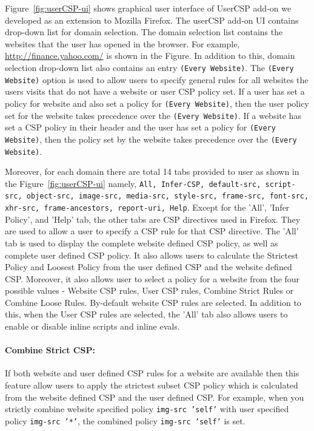 Figure~\ref{fig:userCSP-ui} shows graphical user interface of UserCSP
add-on we developed as an extension to Mozilla Firefox. The userCSP
add-on UI contains drop-down list for domain selection. The domain
selection list contains the websites that the user has opened in the
browser. For example, \url{http://finance.yahoo.com/} is shown in the
Figure. In addition to this, domain selection drop-down list also
contains an entry {\tt * (Every Website)}. The {\tt * (Every Website)}
option is used to allow users to specify general rules for all
websites the users visits that do not have a website or user CSP
policy set. If a user has set a policy for website and also set a
policy for {\tt * (Every Website)}, then the user policy set for the
website takes precedence over the {\tt * (Every Website)}. If a
website has set a CSP policy in their header and the user has set a
policy for {\tt * (Every Website)}, then the policy set by the website
takes precedence over the {\tt * (Every Website)}.

Moreover, for each domain there are total 14 tabs provided to user as
shown in the Figure~\ref{fig:userCSP-ui} namely, {\tt All, Infer-CSP,
  default-src, script-src, object-src, image-src, media-src,
  style-src, frame-src, font-src, xhr-src, frame-ancestors,
  report-uri, Help}. Except for the 'All', 'Infer Policy', and 'Help'
tab, the other tabs are CSP directives used in Firefox. They are used
to allow a user to specify a CSP rule for that CSP directive. The
'All' tab is used to display the complete website defined CSP policy,
as well as complete user defined CSP policy. It also allows users to
calculate the Strictest Policy and Loosest Policy from the user
defined CSP and the website defined CSP. Moreover, it also allows user
to select a policy for a website from the four possible values -
Website CSP rules, User CSP rules, Combine Strict Rules or Combine
Loose Rules. By-default website CSP rules are selected. In addition to
this, when the User CSP rules are selected, the 'All' tab also allows
users to enable or disable inline scripts and inline evals.

\paragraph{\bf Combine Strict CSP:} If both website and user defined CSP rules for a website are available then this feature allow users to apply the strictest subset CSP policy which is calculated from the website defined CSP and the user defined CSP. For example, when you strictly combine website specified policy {\tt img-src 'self'} with user specified policy {\tt img-src '*'}, the combined policy {\tt img-src 'self'} is set.

